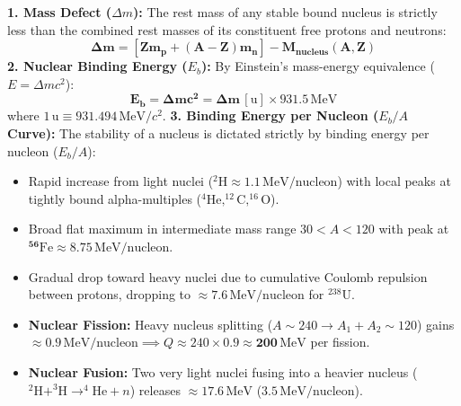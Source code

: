 \documentclass[10pt,a4paper]{article}
\begin{document}
\begin{formulabox}
\textbf{1. Mass Defect ($\Delta m$):}
The rest mass of any stable bound nucleus is strictly less than the combined rest masses of its constituent free protons and neutrons:
\begin{equation}
  \mathbf{\Delta m = [Z m_p + (A - Z) m_n] - M_{\text{nucleus}}(A, Z)}
\end{equation}
\textbf{2. Nuclear Binding Energy ($E_b$):}
By Einstein's mass-energy equivalence ($E = \Delta m c^2$):
\begin{equation}
  \mathbf{E_b = \Delta m c^2 = \Delta m\,[\mathrm{u}] \times 931.5\,\mathrm{MeV}}
\end{equation}
where $1\,\mathrm{u} \equiv 931.494\,\mathrm{MeV}/c^2$.
\textbf{3. Binding Energy per Nucleon ($E_b/A$ Curve):}
The stability of a nucleus is dictated strictly by binding energy per nucleon ($E_b/A$):
\begin{itemize}
  \item Rapid increase from light nuclei ($^2\mathrm{H} \approx 1.1\,\mathrm{MeV/nucleon}$) with local peaks at tightly bound alpha-multiples ($^4\mathrm{He}, ^{12}\mathrm{C}, ^{16}\mathrm{O}$).
  \item Broad flat maximum in intermediate mass range $30 < A < 120$ with peak at $\mathbf{^{56}\mathrm{Fe} \approx 8.75\,\mathrm{MeV/nucleon}}$.
  \item Gradual drop toward heavy nuclei due to cumulative Coulomb repulsion between protons, dropping to $\approx 7.6\,\mathrm{MeV/nucleon}$ for $^{238}\mathrm{U}$.
  \item \textbf{Nuclear Fission:} Heavy nucleus splitting ($A \sim 240 \to A_1 + A_2 \sim 120$) gains $\approx 0.9\,\mathrm{MeV/nucleon} \implies Q \approx 240 \times 0.9 \approx \mathbf{200\,\mathrm{MeV}}$ per fission.
  \item \textbf{Nuclear Fusion:} Two very light nuclei fusing into a heavier nucleus ($^2\mathrm{H} + ^3\mathrm{H} \to ^4\mathrm{He} + n$) releases $\approx \mathbf{17.6\,\mathrm{MeV}}$ ($3.5\,\mathrm{MeV/nucleon}$).
\end{itemize}
\end{formulabox}
\end{document}
